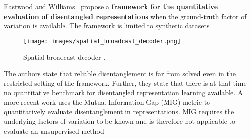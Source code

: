 \documentclass[a4paper,12pt]{report}
\begin{document}
\par Eastwood and Williams~\cite{FwkQuantEvalDisRep} propose a \textbf{framework for the quantitative evaluation of disentangled representations} when the ground-truth factor of variation is available. The framework is limited to synthetic datasets. 
\begin{wrapfigure}{r}{0.4\textwidth}
\texttt{[image: images/spatial\_broadcast\_decoder.png]} 
\caption{Spatial broadcast decoder \cite{SpatialBDecoder}.}
\label{fig:sbd}
\end{wrapfigure}
The authors state that reliable disentanglement is far from solved even in the restricted setting of the framework. Further, they state that there is at that time no quantitative benchmark for disentangled representation learning available. A more recent work \cite{SpatialBDecoder} uses the Mutual Information Gap (MIG) metric to quantitatively evaluate disentanglement in representations. MIG requires the underlying factors of variation to be known and is therefore not applicable to evaluate an unsupervised method.
\end{document}
